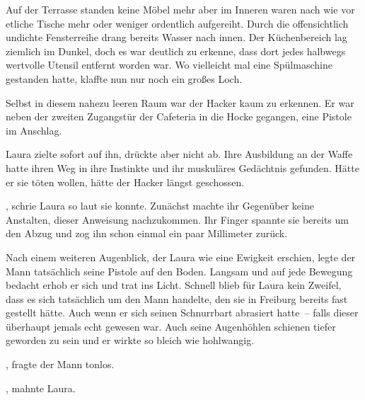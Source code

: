 \par

Auf der Terrasse standen keine Möbel mehr aber im Inneren waren nach wie vor etliche Tische mehr oder weniger ordentlich aufgereiht. Durch die offensichtlich undichte Fensterreihe drang bereits Wasser nach innen. Der Küchenbereich lag ziemlich im Dunkel, doch es war deutlich zu erkenne, dass dort jedes halbwegs wertvolle Utensil entfernt worden war. Wo vielleicht mal eine Spülmaschine gestanden hatte, klaffte nun nur noch ein großes Loch.

\par

Selbst in diesem nahezu leeren Raum war der Hacker kaum zu erkennen. Er war neben der zweiten Zugangstür der Cafeteria in die Hocke gegangen, eine Pistole im Anschlag.

\par

Laura zielte sofort auf ihn, drückte aber nicht ab. Ihre Ausbildung an der Waffe hatte ihren Weg in ihre Instinkte und ihr muskuläres Gedächtnis gefunden. Hätte er sie töten wollen, hätte der Hacker längst geschossen.

\par

, schrie Laura so laut sie konnte. Zunächst machte ihr Gegenüber keine Anstalten, dieser Anweisung nachzukommen.  Ihr Finger spannte sie bereits um den Abzug und zog ihn schon einmal ein paar Millimeter zurück.

\par

Nach einem weiteren Augenblick, der Laura wie eine Ewigkeit erschien, legte der Mann tatsächlich seine Pistole auf den Boden. Langsam und auf jede Bewegung bedacht erhob er sich und trat ins Licht. Schnell blieb für Laura kein Zweifel, dass es sich tatsächlich um den Mann handelte, den sie in Freiburg bereits fast gestellt hätte. Auch wenn er sich seinen Schnurrbart abrasiert hatte~-- falls dieser überhaupt jemals echt gewesen war. Auch seine Augenhöhlen schienen tiefer geworden zu sein und er wirkte so bleich wie hohlwangig.

\par

, fragte der Mann tonlos.

\par

, mahnte Laura.

\par

